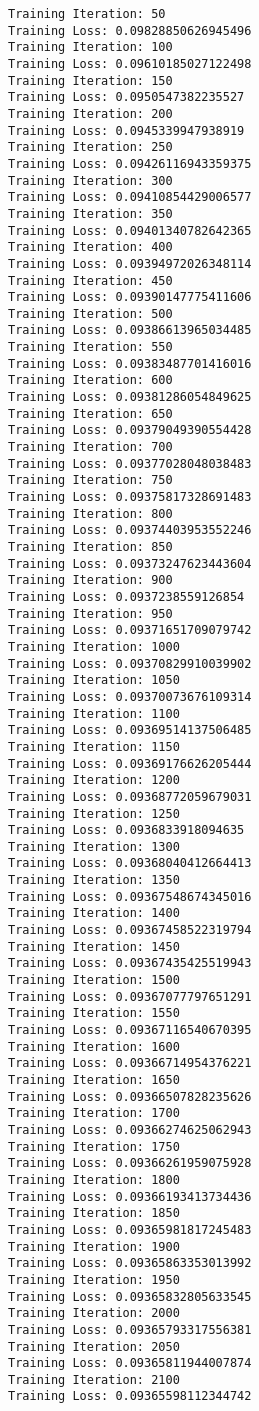 \documentclass[11pt]{article}
\begin{document}
    \begin{Verbatim}[commandchars=\\\{\}]
Training Iteration: 50
Training Loss: 0.09828850626945496
Training Iteration: 100
Training Loss: 0.09610185027122498
Training Iteration: 150
Training Loss: 0.0950547382235527
Training Iteration: 200
Training Loss: 0.0945339947938919
Training Iteration: 250
Training Loss: 0.09426116943359375
Training Iteration: 300
Training Loss: 0.09410854429006577
Training Iteration: 350
Training Loss: 0.09401340782642365
Training Iteration: 400
Training Loss: 0.09394972026348114
Training Iteration: 450
Training Loss: 0.09390147775411606
Training Iteration: 500
Training Loss: 0.09386613965034485
Training Iteration: 550
Training Loss: 0.09383487701416016
Training Iteration: 600
Training Loss: 0.09381286054849625
Training Iteration: 650
Training Loss: 0.09379049390554428
Training Iteration: 700
Training Loss: 0.09377028048038483
Training Iteration: 750
Training Loss: 0.09375817328691483
Training Iteration: 800
Training Loss: 0.09374403953552246
Training Iteration: 850
Training Loss: 0.09373247623443604
Training Iteration: 900
Training Loss: 0.0937238559126854
Training Iteration: 950
Training Loss: 0.09371651709079742
Training Iteration: 1000
Training Loss: 0.09370829910039902
Training Iteration: 1050
Training Loss: 0.09370073676109314
Training Iteration: 1100
Training Loss: 0.09369514137506485
Training Iteration: 1150
Training Loss: 0.09369176626205444
Training Iteration: 1200
Training Loss: 0.09368772059679031
Training Iteration: 1250
Training Loss: 0.0936833918094635
Training Iteration: 1300
Training Loss: 0.09368040412664413
Training Iteration: 1350
Training Loss: 0.09367548674345016
Training Iteration: 1400
Training Loss: 0.09367458522319794
Training Iteration: 1450
Training Loss: 0.09367435425519943
Training Iteration: 1500
Training Loss: 0.09367077797651291
Training Iteration: 1550
Training Loss: 0.09367116540670395
Training Iteration: 1600
Training Loss: 0.09366714954376221
Training Iteration: 1650
Training Loss: 0.09366507828235626
Training Iteration: 1700
Training Loss: 0.09366274625062943
Training Iteration: 1750
Training Loss: 0.09366261959075928
Training Iteration: 1800
Training Loss: 0.09366193413734436
Training Iteration: 1850
Training Loss: 0.09365981817245483
Training Iteration: 1900
Training Loss: 0.09365863353013992
Training Iteration: 1950
Training Loss: 0.09365832805633545
Training Iteration: 2000
Training Loss: 0.09365793317556381
Training Iteration: 2050
Training Loss: 0.09365811944007874
Training Iteration: 2100
Training Loss: 0.09365598112344742

\end{Verbatim}
\end{document}

